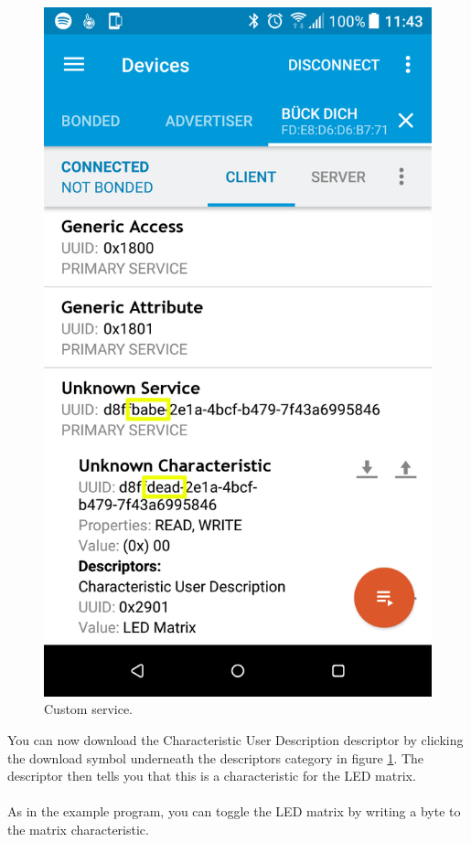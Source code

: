\documentclass[11pt,a4paper]{article}
\begin{document}
\begin{figure}[ht]
\begin{minipage}{0.5\linewidth}
\includegraphics[width=0.9\linewidth]{example_exercise_gatt_highlighted.png}
\caption{Custom service.}
\label{fig::exercise_service}
\end{minipage}
\end{figure}
\noindent
You can now download the Characteristic User Description descriptor by clicking the download symbol underneath the descriptors category in figure \ref{fig::exercise_service}. The descriptor then tells you that this is a characteristic for the LED matrix.\\
\\
As in the example program, you can toggle the LED matrix by writing a byte to the matrix characteristic.
\end{document}

